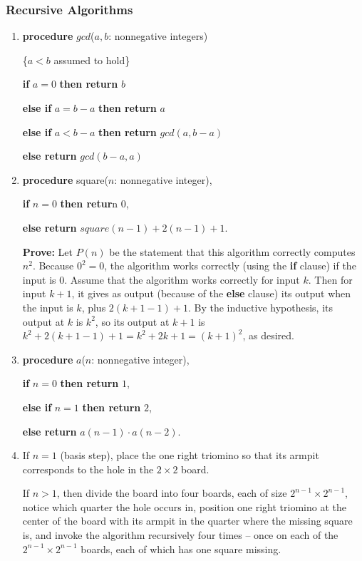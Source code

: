 \documentclass{../../cls/sig-alternate-05-2015}
\begin{document}
\subsubsection{Recursive Algorithms}
\begin{enumerate}
\item 
\textbf{procedure} $gcd$($a, b$: nonnegative integers)

\{$a < b$ assumed to hold\}

\textbf{if} $a = 0$ \textbf{then return} $b$

\textbf{else if} $a = b - a$ \textbf{then return} $a$

\textbf{else if} $a < b - a$ \textbf{then return} $gcd(a, b - a)$

\textbf{else return} $gcd(b - a, a)$


\item  \textbf{procedure} square($n$: nonnegative integer),

\textbf{if} $n = 0$ \textbf{then retur}n $0$,

\textbf{else return} $square (n - 1) + 2(n - 1) + 1$.

\textbf{Prove:} Let $P (n)$ be the statement that this algorithm correctly computes $n^2$. Because $0^2 = 0$, the algorithm works correctly
(using the \textbf{if} clause) if the input is $0$. Assume that the algorithm works correctly for input $k$. Then for input $k + 1$, it
gives as output (because of the \textbf{else} clause) its output when
the input is $k$, plus $2(k + 1 - 1) + 1$. By the inductive
hypothesis, its output at $k$ is $k^2$, so its output at $k + 1$ is
$k^2 + 2(k + 1 - 1) + 1 = k^2 + 2k + 1 = (k + 1)^2$, as desired.



\item 
\textbf{procedure} $a$($n$: nonnegative integer),

\textbf{if} $n = 0$ \textbf{then return} $1$,

\textbf{else if} $n = 1$ \textbf{then return} $2$,

\textbf{else return} $a(n - 1) \cdot a(n - 2)$.


	
\item If $n = 1$ (basis step),
place the one right triomino so that its armpit corresponds to the hole in the $2 \times 2$ board.

If $n > 1$,
then divide the board into four boards, each of size $2^{n - 1} \times 2^{n - 1}$,
notice which quarter the hole occurs in,
position one right triomino at the center of the board with its armpit in the quarter where the missing square is,
and invoke the algorithm recursively four times -- once on each of the $2^{n - 1} \times 2^{n - 1}$ boards,
each of which has one square missing.


\end{enumerate}
\end{document}
